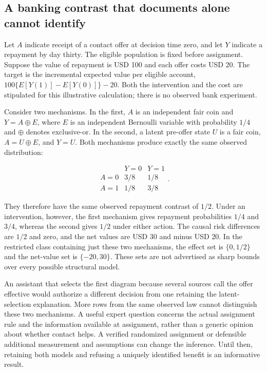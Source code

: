 \hypertarget{a-banking-contrast-that-documents-alone-cannot-identify}{%
\subsection{A banking contrast that documents alone cannot
identify}\label{a-banking-contrast-that-documents-alone-cannot-identify}}

Let \(A\) indicate receipt of a contact offer at decision time zero, and
let \(Y\) indicate a repayment by day thirty. The eligible population is
fixed before assignment. Suppose the value of repayment is USD 100 and
each offer costs USD 20. The target is the incremental expected value
per eligible account, \(100\{E[Y(1)]-E[Y(0)]\}-20\). Both the
intervention and the cost are stipulated for this illustrative
calculation; there is no observed bank experiment.

Consider two mechanisms. In the first, \(A\) is an independent fair coin
and \(Y=A\mathbin{\oplus}E\), where \(E\) is an independent Bernoulli
variable with probability \(1/4\) and \(\oplus\) denotes exclusive-or.
In the second, a latent pre-offer state \(U\) is a fair coin,
\(A=U\mathbin{\oplus}E\), and \(Y=U\). Both mechanisms produce exactly
the same observed distribution:

\[
\begin{array}{c|cc}
 &Y=0&Y=1\\\hline
A=0&3/8&1/8\\
A=1&1/8&3/8
\end{array}.
\]

They therefore have the same observed repayment contrast of \(1/2\).
Under an intervention, however, the first mechanism gives repayment
probabilities \(1/4\) and \(3/4\), whereas the second gives \(1/2\)
under either action. The causal risk differences are \(1/2\) and zero,
and the net values are USD 30 and minus USD 20. In the restricted class
containing just these two mechanisms, the effect set is \(\{0,1/2\}\)
and the net-value set is \(\{-20,30\}\). These sets are not advertised
as sharp bounds over every possible structural model.
\citep{exec14_expert_oracle}

An assistant that selects the first diagram because several sources call
the offer effective would authorize a different decision from one
retaining the latent-selection explanation. More rows from the same
observed law cannot distinguish these two mechanisms. A useful expert
question concerns the actual assignment rule and the information
available at assignment, rather than a generic opinion about whether
contact helps. A verified randomized assignment or defensible additional
measurement and assumptions can change the inference. Until then,
retaining both models and refusing a uniquely identified benefit is an
informative result.

